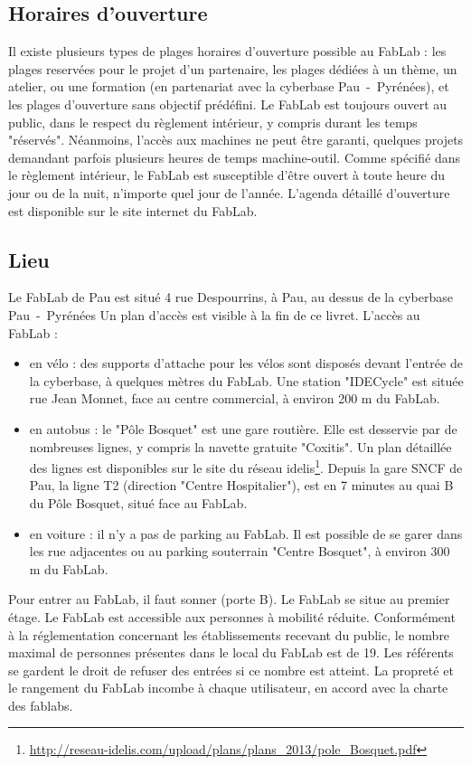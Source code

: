 \subsection{Horaires d'ouverture}
Il existe plusieurs types de plages horaires d'ouverture possible au FabLab : les plages reservées pour le projet d'un partenaire, les plages dédiées à un thème, un atelier, ou une formation (en partenariat avec la cyberbase Pau~-~Pyrénées), et les plages d'ouverture sans objectif prédéfini.
Le FabLab est toujours ouvert au public, dans le respect du règlement intérieur, y compris durant les temps "réservés". Néanmoins, l'accès aux machines ne peut être garanti, quelques projets demandant parfois plusieurs heures de temps machine-outil.
Comme spécifié dans le règlement intérieur, le FabLab est susceptible d'être ouvert à toute heure du jour ou de la nuit, n'importe quel jour de l'année.
L'agenda détaillé d'ouverture est disponible sur le site internet du FabLab. %

\subsection{Lieu}
Le FabLab de Pau est situé 4 rue Despourrins, à Pau, au dessus de la cyberbase Pau~-~Pyrénées
Un plan d'accès est visible à la fin de ce livret.
L'accès au FabLab :
\begin{itemize}
  \item en vélo : des supports d'attache pour les vélos sont disposés devant l'entrée de la cyberbase, à quelques mètres du FabLab. Une station "IDECycle" est située rue Jean Monnet, face au centre commercial, à environ 200 m du FabLab.
  \item en autobus : le "Pôle Bosquet" est une gare routière. Elle est desservie par de nombreuses lignes, y compris la navette gratuite "Coxitis". Un plan détaillée des lignes est disponibles sur le site du réseau idelis\footnote{\url{http://reseau-idelis.com/upload/plans/plans\_2013/pole\_Bosquet.pdf}}. Depuis la gare SNCF de Pau, la ligne T2 (direction "Centre Hospitalier"), est en 7 minutes au quai B du Pôle Bosquet, situé face au FabLab.
  \item en voiture : il n'y a pas de parking au FabLab. Il est possible de se garer dans les rue adjacentes ou au parking souterrain "Centre Bosquet", à environ 300 m du FabLab.
\end{itemize}
Pour entrer au FabLab, il faut sonner (porte B). Le FabLab se situe au premier étage. %
Le FabLab est accessible aux personnes à mobilité réduite.
Conformément à la réglementation concernant les établissements recevant du public, le nombre maximal de personnes présentes dans le local du FabLab est de 19. Les référents se gardent le droit de refuser des entrées si ce nombre est atteint.
La propreté et le rangement du FabLab incombe à chaque utilisateur, en accord avec la charte des fablabs.

